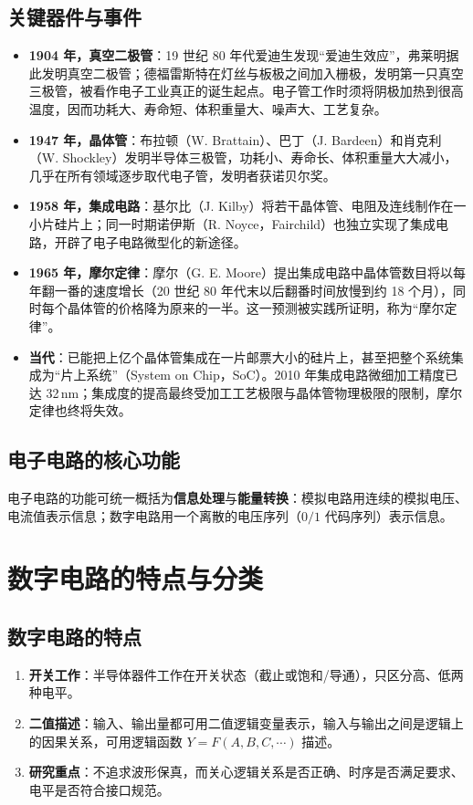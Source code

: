 \subsection{关键器件与事件}
\begin{itemize}
    \item \textbf{1904 年，真空二极管}：19 世纪 80 年代爱迪生发现``爱迪生效应''，弗莱明据此发明真空二极管；德福雷斯特在灯丝与板极之间加入栅极，发明第一只真空三极管，被看作电子工业真正的诞生起点。电子管工作时须将阴极加热到很高温度，因而功耗大、寿命短、体积重量大、噪声大、工艺复杂。
    \item \textbf{1947 年，晶体管}：布拉顿（W. Brattain）、巴丁（J. Bardeen）和肖克利（W. Shockley）发明半导体三极管，功耗小、寿命长、体积重量大大减小，几乎在所有领域逐步取代电子管，发明者获诺贝尔奖。
    \item \textbf{1958 年，集成电路}：基尔比（J. Kilby）将若干晶体管、电阻及连线制作在一小片硅片上；同一时期诺伊斯（R. Noyce，Fairchild）也独立实现了集成电路，开辟了电子电路微型化的新途径。
    \item \textbf{1965 年，摩尔定律}：摩尔（G. E. Moore）提出集成电路中晶体管数目将以每年翻一番的速度增长（20 世纪 80 年代末以后翻番时间放慢到约 18 个月），同时每个晶体管的价格降为原来的一半。这一预测被实践所证明，称为``摩尔定律''。
    \item \textbf{当代}：已能把上亿个晶体管集成在一片邮票大小的硅片上，甚至把整个系统集成为``片上系统''（System on Chip，SoC）。2010 年集成电路微细加工精度已达 32\,nm；集成度的提高最终受加工工艺极限与晶体管物理极限的限制，摩尔定律也终将失效。
\end{itemize}

\subsection{电子电路的核心功能}
电子电路的功能可统一概括为\textbf{信息处理}与\textbf{能量转换}：模拟电路用连续的模拟电压、电流值表示信息；数字电路用一个离散的电压序列（$0/1$ 代码序列）表示信息。

\section{数字电路的特点与分类}
\subsection{数字电路的特点}
\begin{enumerate}
    \item \textbf{开关工作}：半导体器件工作在开关状态（截止或饱和/导通），只区分高、低两种电平。
    \item \textbf{二值描述}：输入、输出量都可用二值逻辑变量表示，输入与输出之间是逻辑上的因果关系，可用逻辑函数 $Y=F(A,B,C,\cdots)$ 描述。
    \item \textbf{研究重点}：不追求波形保真，而关心逻辑关系是否正确、时序是否满足要求、电平是否符合接口规范。
\end{enumerate}

